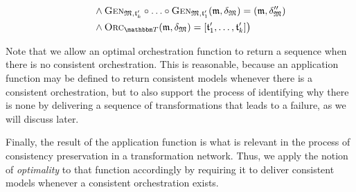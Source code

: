 \begin{definition}
\begin{align*}
            & \formulaskip \formulaskip
            \land \generalizationfunction{\metamodeltuple{M},\transformation{t}_{k}'} \concatfunction \dots \concatfunction \generalizationfunction{\metamodeltuple{M},\transformation{t}_{1}'}(\modeltuple{m}, \changetuple{\metamodeltuple{M}}) = (\modeltuple{m}, \changetuple{\metamodeltuple{M}}'') \\
            & \formulaskip \formulaskip
            \land \orcfunction{\transformationset{T}}(\modeltuple{m}, \changetuple{\metamodeltuple{M}}) = \sequenced{\transformation{t}_{1}', \dots, \transformation{t}_{k}'} %
        \bigr) %
    \end{align*}
\end{definition}

Note that we allow an optimal orchestration function to return a sequence when there is no consistent orchestration.
This is reasonable, because an application function may be defined to return consistent models whenever there is a consistent orchestration, but to also support the process of identifying why there is none by delivering a sequence of transformations that leads to a failure, as we will discuss later.

Finally, the result of the application function is what is relevant in the process of consistency preservation in a transformation network.
Thus, we apply the notion of \emph{optimality} to that function accordingly by requiring it to deliver consistent models whenever a consistent orchestration exists.

